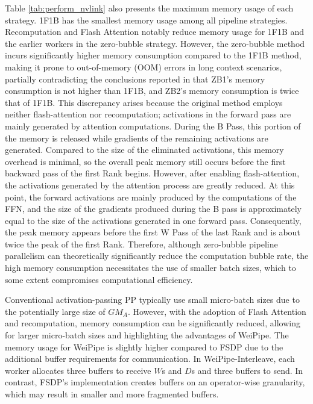 \documentclass[sigplan,screen]{acmart}
\begin{document}
Table \ref{tab:perform_nvlink} also presents the maximum memory usage of each strategy. 1F1B has the smallest memory usage among all pipeline strategies. Recomputation and Flash Attention notably reduce memory usage for 1F1B and the earlier workers in the zero-bubble strategy. However,  the zero-bubble method incurs significantly higher memory consumption compared to the 1F1B method, making it prone to out-of-memory (OOM) errors in long context scenarios, partially contradicting the conclusions reported in \cite{qi2023zerobubblepipelineparallelism} that ZB1's memory consumption is not higher than 1F1B, and ZB2's memory consumption is twice that of 1F1B. This discrepancy arises because the original method employs neither flash-attention nor recomputation; activations in the forward pass are mainly generated by attention computations. During the B Pass, this portion of the memory is released while gradients of the remaining activations are generated. Compared to the size of the eliminated activations, this memory overhead is minimal, so the overall peak memory still occurs before the first backward pass of the first Rank begins. However, after enabling flash-attention, the activations generated by the attention process are greatly reduced. At this point, the forward activations are mainly produced by the computations of the FFN, and the size of the gradients produced during the B pass is approximately equal to the size of the activations generated in one forward pass. Consequently, the peak memory appears before the first W Pass of the last Rank and is about twice the peak of the first Rank. Therefore, although zero-bubble pipeline parallelism can theoretically significantly reduce the computation bubble rate, the high memory consumption necessitates the use of smaller batch sizes, which to some extent compromises computational efficiency.

Conventional activation-passing PP typically use small micro-batch sizes due to the potentially large size of $GM_A$. However, with the adoption of Flash Attention and recomputation, memory consumption can be significantly reduced, allowing for larger micro-batch sizes and highlighting the advantages of WeiPipe. The memory usage for WeiPipe is slightly higher compared to FSDP due to the additional buffer requirements for communication. In WeiPipe-Interleave, each worker allocates three buffers to receive $W$s and $D$s and three buffers to send. In contrast, FSDP's implementation creates buffers on an operator-wise granularity, which may result in smaller and more fragmented buffers.
\end{document}
